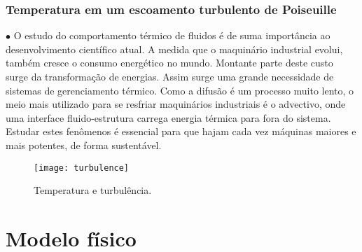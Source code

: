 \documentclass[xcolor=dvipsnames,10pt,aspectratio=169]{beamer}
\begin{document}
	
		\begin{frame}
		\frametitle{Temperatura em um escoamento turbulento de Poiseuille}
			\begin{minipage}[h!]{0.49\textwidth}
			$\bullet$ O estudo do comportamento térmico de fluidos é de suma importância ao desenvolvimento científico atual. A medida que o maquinário industrial evolui, também cresce o consumo energético no mundo. Montante parte deste custo surge da transformação de energias. Assim surge uma grande necessidade de sistemas de gerenciamento térmico. Como a difusão é um processo muito lento, o meio mais utilizado para se resfriar maquinários industriais é o advectivo, onde uma interface fluido-estrutura carrega energia térmica para fora do sistema. Estudar estes fenômenos é essencial para que hajam cada vez máquinas maiores e mais potentes, de forma sustentável. 
		\end{minipage}
		\begin{minipage}[h!]{0.49\textwidth}
			\begin{figure}[h!]
				\centering
				\texttt{[image: turbulence]}
				\caption{Temperatura e turbulência.}
			\end{figure}
		\end{minipage}
		\end{frame}





	\section{Modelo físico}
	
	
	
	
	
\end{document}
